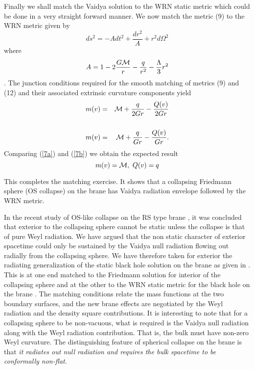 \documentclass[a4paper,twocolumn,showpacs,preprintnumbers,amsmath,amssymb]{revtex4}
\begin{document}
Finally we shall match the Vaidya solution to the WRN static metric which 
could be done in a very straight forward manner. 
We now match the metric (9) to the WRN metric given by
\begin{equation} \label{6}
ds^2 = - A dt^2 + \frac{d r^2}{A} + r^2d\Omega^2 \end{equation}
where
\[A = 1 - 2\frac{G{\cal M}}{r} - \frac{q}{r^2} - \frac{\Lambda}{3}{r}^2\].
The junction conditions required for the smooth matching of 
metrics (9) and (12) and their associated extrinsic curvature components yield
\begin{eqnarray}
m(v) &=& {\cal M} + \frac{q}{2Gr} - \frac{Q(v)}{2Gr} \label{7a}\\ \nonumber \\
m(v) &=& {\cal M} + \frac{q}{Gr} - \frac{Q(v)}{Gr} .\label{7b}
\end{eqnarray}
Comparing (\ref{7a}) and (\ref{7b}) we obtain the expected result 
\begin{equation}
m(v) = {\cal M},  ~ Q(v) = {q}\end{equation}


This completes the matching exercise. It shows that a collapsing Friedmann 
sphere (OS collapse) on the brane has Vaidya radiation envelope followed by 
the WRN metric. 



In the recent study of OS-like collapse on the RS type brane \cite{r}, it
was concluded that exterior to the collapsing sphere cannot be static
unless the collapse is that of pure Weyl radiation. We have argued that the  
non static character of exterior spacetime could only be sustained by 
the Vaidya null radiation flowing out radially from the collapsing sphere. 
We have therefore taken for exterior the radiating generalization of the 
static black hole solution on the brane as given in \cite{n2}. This is at one 
end matched to the Friedmann solution for interior of the collapsing sphere 
and at the other to the WRN static metric for the black hole on the brane 
\cite{r6}. The matching conditions relate the mass functions at the two 
boundary surfaces, and the new brane effects are negotiated by the Weyl 
radiation and the density square contributions. It is interesting to note 
that for a collapsing sphere to be non-vacuous, what is required is the 
Vaidya null radiation along with the Weyl radiation contribution. That is, 
the bulk must have non-zero Weyl curvature. The distinguishing feature of 
spherical collapse on the brane is that 
{\em it radiates out null radiation and requires the bulk spacetime 
to be conformally non-flat}. 
\end{document}
